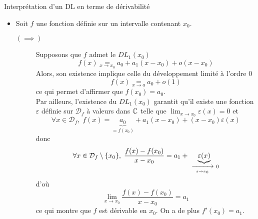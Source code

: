 \documentclass{article}
\renewenvironment{question_kholle}[2][ ]
{
	\subsection{\texorpdfstring{#2}{}}
	\notblank{#1}
	{
		\noindent #1
		\bigbreak
	}
	{}
	\begin{proof}
}
{
	\end{proof}
}
\begin{document}
\begin{question_kholle}{Interprétation d’un DL en terme de dérivabilité}
	\hfill\\
	\begin{itemize}[label=$\vartriangleright$]
		\item Soit $f$ une fonction définie sur un intervalle contenant $x_{0}$.
		      \begin{description}
			      \item[$(\implies)$] Supposons que $f$ admet le $DL_{1}(x_{0})$
			            \[
				            f(x)\underset{x\to x_{0}}{=} a_{0} + a_{1}(x-x_{0})+o(x-x_{0})
			            \]
			            Alors, son existence implique celle du développement limité à l’ordre 0
			            \[
				            f(x)\underset{x \rightarrow a}{=} a_{0}+o(1)
			            \]
			            ce qui permet d’affirmer que $f(x_{0})=a_{0}$.\\
			            Par ailleurs, l’existence du $DL_{1}(x_{0})$ garantit qu’il existe une fonction $\varepsilon$ définie sur $\mathcal{D}_{f}$ à valeurs dans $\mathbb C$ telle que $\lim_{x\to x_{0}}\varepsilon(x)=0$ et
			            \[
				            \forall x\in \mathcal{D}_{f} ,\; f(x)=\underbrace{a_{0}}_{=f(x_{0})} + a_{1}(x-x_{0}) + (x-x_{0})\varepsilon (x)
			            \]
			            donc
			            \[
				            \forall x\in \mathcal{D}_{f}\setminus \{x_{0}\},\; \frac{f(x)-f(x_{0})}{x-x_{0}}=a_{1}+\underbrace{\varepsilon(x)}_{\ \xrightarrow[\;x \to x_{0}\;]{}\ 0}
			            \]
			            d’où
			            \[
				            \lim_{x\to x_{0}}\frac{f(x)-f(x_{0})}{x-x_{0}}=a_{1}
			            \]
			            ce qui montre que $f$ est dérivable en $x_{0}$. On a de plus $f'(x_{0})=a_{1}$.


\end{description}
\end{itemize}
\end{question_kholle}
\end{document}
